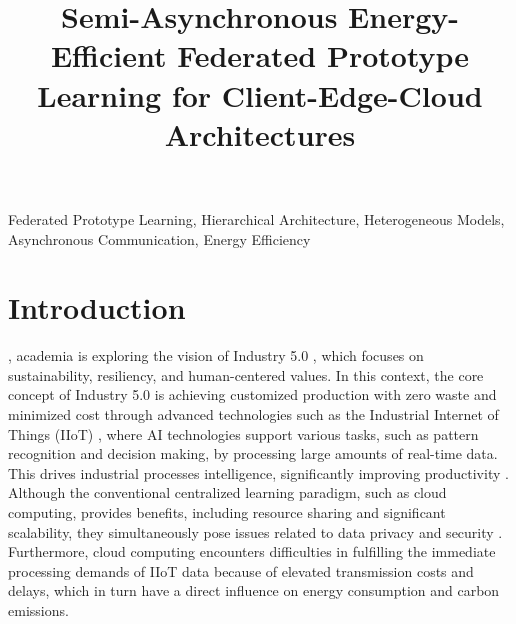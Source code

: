 \documentclass[journal]{IEEEtran}
\begin{document}
\title{Semi-Asynchronous Energy-Efficient Federated Prototype Learning for Client-Edge-Cloud Architectures}




\maketitle

\begin{abstract}

\end{abstract}

\begin{IEEEkeywords}
  Federated Prototype Learning, Hierarchical Architecture, Heterogeneous Models, Asynchronous Communication, Energy Efficiency
\end{IEEEkeywords}

\section{Introduction}
, academia is exploring the vision of Industry 5.0 \cite{zeb2024towards_industry5.0,leng2024unlocking_industry5.0}, which focuses on sustainability, resiliency, and human-centered values. In this context, the core concept of Industry 5.0 is achieving customized production with zero waste and minimized cost through advanced technologies such as the Industrial Internet of Things (IIoT) \cite{zeb2024towards_industry5.0,10440434}, where AI technologies support various tasks, such as pattern recognition and decision making, by processing large amounts of real-time data. This drives industrial processes intelligence, significantly improving productivity \cite{liu2024federated_sensors, de2024spatio_agriculture}. Although the conventional centralized learning paradigm, such as cloud computing, provides benefits, including resource sharing and significant scalability, they simultaneously pose issues related to data privacy and security \cite{boobalan2022fusion}. Furthermore, cloud computing encounters difficulties in fulfilling the immediate processing demands of IIoT data because of elevated transmission costs and delays, which in turn have a direct influence on energy consumption and carbon emissions.
\end{document}
